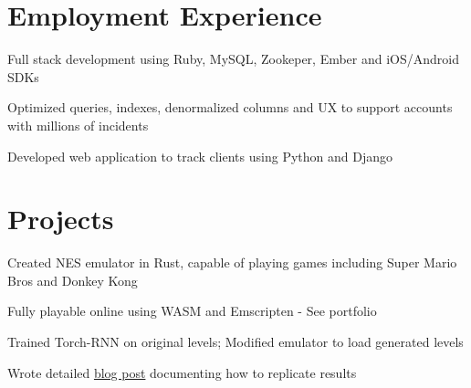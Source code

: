 \documentclass[]{deedy-resume-openfont}
\begin{document}
\hfill
\begin{minipage}[t]{0.67\textwidth} 


\section{Employment Experience}
\vspace{\topsep} %
\begin{tightemize}
	\item Full stack development using Ruby, MySQL, Zookeper, Ember and iOS/Android SDKs
	\item Optimized queries, indexes, denormalized columns and UX to support accounts with millions of incidents
\end{tightemize}
\sectionsep

\begin{tightemize}
\item Developed web application to track clients using Python and Django
\end{tightemize}
\sectionsep

\section{Projects}

\begin{tightemize}
	\item Created NES emulator in Rust, capable of playing games including Super Mario Bros and Donkey Kong
	\item Fully playable online using WASM and Emscripten - See portfolio
\end{tightemize}
\sectionsep

\begin{tightemize}
	\item Trained Torch-RNN on original levels; Modified emulator to load generated levels
	\item Wrote detailed  \href{https://medium.com/@justin_michaud/super-mario-bros-level-generation-using-torch-rnn-726ddea7e9b7}{blog post} documenting how to replicate results
\end{tightemize}
\sectionsep


\end{minipage}
\end{document}
